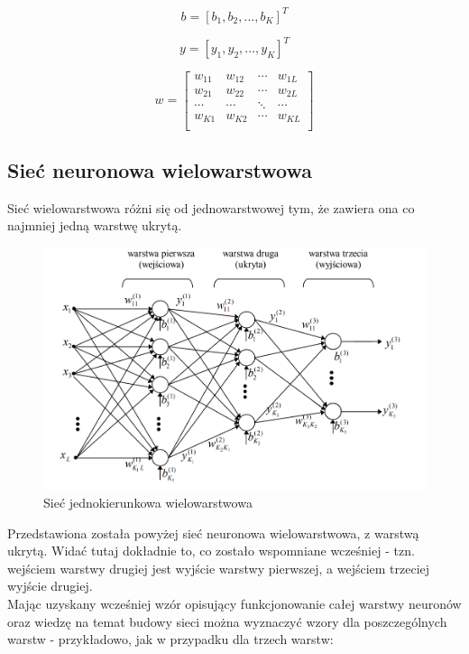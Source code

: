 \documentclass[a4paper, 12pt]{article}
\begin{document}
\begin{equation}
b = [b_1, b_2, ..., b_K]^T
\label{Eq:2.6}
\end{equation}

\begin{equation}
y = [y_1, y_2, ..., y_K]^T
\label{Eq:2.7}
\end{equation}

\begin{equation}
w = 
\begin{bmatrix}
  w_{11} & w_{12} & \cdots & w_{1L} \\ 
  w_{21} & w_{22} & \cdots & w_{2L} \\ 
  \cdots & \cdots & \ddots & \cdots \\ 
  w_{K1} & w_{K2} & \cdots & w_{KL} \\ 
 \end{bmatrix}
\label{Eq:2.8}
\end{equation}

\subsection{Sieć neuronowa wielowarstwowa}
Sieć wielowarstwowa różni się od jednowarstwowej tym, że zawiera ona co najmniej jedną warstwę ukrytą.

\begin{figure}[hbt!]
\includegraphics[width=15cm]{Sieci}
\centering
\caption{Sieć jednokierunkowa wielowarstwowa\cite {book6}}
\end{figure}
Przedstawiona została powyżej sieć neuronowa wielowarstwowa, z warstwą ukrytą. Widać tutaj dokładnie to, co zostało wspomniane wcześniej - tzn. wejściem warstwy drugiej jest wyjście warstwy pierwszej, a wejściem trzeciej wyjście drugiej.\\
Mając uzyskany wcześniej wzór opisujący funkcjonowanie całej warstwy neuronów oraz wiedzę na temat budowy sieci można wyznaczyć wzory dla poszczególnych warstw - przykładowo, jak w przypadku dla trzech warstw:
\end{document}
